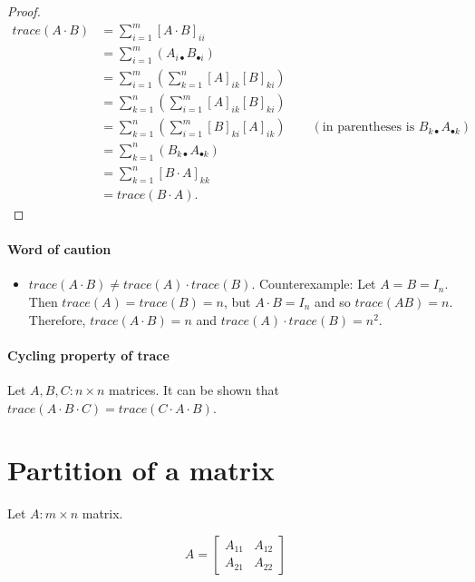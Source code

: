 \documentclass[12pt]{article}
\theoremstyle{definition}
\begin{document}
\begin{proof}
\begin{align*}
trace(A \cdot B) &= \sum_{i = 1}^{m} [A \cdot B]_{ii} \\
&= \sum_{i = 1}^{m} ( A_{i \bullet} B_{\bullet i} ) \\
&= \sum_{i = 1}^{m} \left( \sum_{k = 1}^{n} [A]_{ik} [B]_{ki} \right) \\
&= \sum_{k = 1}^{n} \left( \sum_{i = 1}^{m} [A]_{ik} [B]_{ki} \right) \\
&= \sum_{k = 1}^{n} \left( \sum_{i = 1}^{m} [B]_{ki} [A]_{ik} \right) \quad \quad (\text{in parentheses is } B_{k \bullet} A_{\bullet k}) \\
&= \sum_{k = 1}^{n} \left( B_{k \bullet} A_{\bullet k} \right) \\
&= \sum_{k = 1}^{n} [B \cdot A]_{kk} \\
&= trace(B \cdot A).
\end{align*}
\end{proof}

\paragraph{Word of caution}

\begin{itemize}
\item $trace(A \cdot B) \neq trace(A) \cdot trace(B)$.
Counterexample: Let $A = B = I_n$. Then $trace(A) = trace(B) = n$, but $A \cdot B = I_n$ and so $trace(AB) = n$.
Therefore, $trace(A \cdot B) = n$ and $trace(A) \cdot trace(B) = n^2$.
\end{itemize}

\paragraph{Cycling property of trace}
Let $A, B, C : n \times n$ matrices. It can be shown that $trace(A \cdot B \cdot C) = trace(C \cdot A \cdot B)$.

\section{Partition of a matrix}

Let $A : m \times n$ matrix.

\[
A = \left[
\begin{array}{c|c}
A_{11} & A_{12} \\ \hline
A_{21} & A_{22}
\end{array}
\right]
\]
\end{document}
